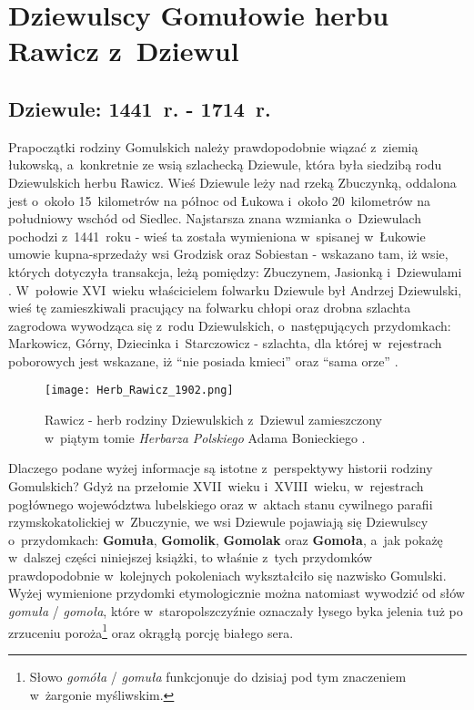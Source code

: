 \chapter{Dziewulscy Gomułowie herbu Rawicz z~Dziewul}



\section{Dziewule: 1441~r. - 1714~r.}

Prapoczątki rodziny Gomulskich należy prawdopodobnie wiązać z~ziemią 
łukowską, a~konkretnie ze wsią szlachecką Dziewule, która była siedzibą rodu 
Dziewulskich herbu Rawicz. Wieś Dziewule leży nad rzeką Zbuczynką, oddalona 
jest o~około 15~kilometrów na północ od Łukowa i~około 20~kilometrów na 
południowy wschód od Siedlec. Najstarsza znana wzmianka o~Dziewulach pochodzi 
z~1441~roku - wieś ta została wymieniona w~spisanej w~Łukowie umowie 
kupna-sprzedaży wsi Grodzisk oraz Sobiestan - wskazano tam, iż wsie, których 
dotyczyła transakcja, leżą pomiędzy: Zbuczynem, Jasionką i~Dziewulami 
\cite{skuras}. W~połowie XVI~wieku właścicielem folwarku Dziewule był 
Andrzej Dziewulski, wieś tę zamieszkiwali pracujący na folwarku chłopi oraz 
drobna szlachta zagrodowa wywodząca się z~rodu Dziewulskich, o~następujących 
przydomkach: Markowicz, Górny, Dziecinka i~Starczowicz \cite{eszeliga} - 
szlachta, dla której w~rejestrach poborowych jest wskazane, iż \enquote{nie 
posiada kmieci} oraz \enquote{sama orze} \cite{aboczek}.

\begin{figure}[!ht]
    \vspace*{0.6cm}
    \centering \texttt{[image: Herb\_Rawicz\_1902.png]}
    \captionsetup{format=hang}
    \caption{Rawicz - herb rodziny Dziewulskich z~Dziewul zamieszczony 
    w~piątym tomie \emph{Herbarza Polskiego} Adama Bonieckiego 
    \cite{aboniecki}.}
    \label{fig:dziewulscy_herb}
\end{figure}

Dlaczego podane wyżej informacje są istotne z~perspektywy historii rodziny 
Gomulskich? Gdyż na przełomie XVII~wieku i~XVIII~wieku, w~rejestrach 
pogłównego województwa lubelskiego \cite{agad1} oraz w~aktach stanu cywilnego 
parafii rzymskokatolickiej w~Zbuczynie, we wsi Dziewule pojawiają się 
Dziewulscy o~przydomkach: \textbf{Gomuła}, \textbf{Gomolik}, \textbf{Gomolak} 
oraz \textbf{Gomoła}, a~jak pokażę w~dalszej części niniejszej książki, to 
właśnie z~tych przydomków prawdopodobnie w~kolejnych pokoleniach wykształciło 
się nazwisko Gomulski. Wyżej wymienione przydomki etymologicznie można 
natomiast wywodzić od słów  \emph{gomuła} / \emph{gomoła}, które 
w~staropolszczyźnie oznaczały łysego byka jelenia tuż po zrzuceniu 
poroża\footnote{Słowo \emph{gomóła} / \emph{gomuła} funkcjonuje do dzisiaj 
pod tym znaczeniem w~żargonie myśliwskim.} oraz okrągłą porcję białego sera.

